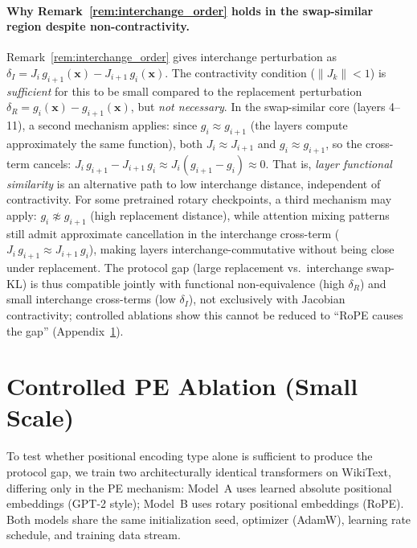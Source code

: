 \documentclass{article}
\begin{document}
\paragraph{Why Remark~\ref{rem:interchange_order} holds in the swap-similar region despite non-contractivity.}
Remark~\ref{rem:interchange_order} gives interchange perturbation as $\delta_I = J_i\, g_{i+1}(\mathbf{x}) - J_{i+1}\, g_i(\mathbf{x})$. The contractivity condition ($\|J_k\| < 1$) is \emph{sufficient} for this to be small compared to the replacement perturbation $\delta_R = g_i(\mathbf{x}) - g_{i+1}(\mathbf{x})$, but \emph{not necessary}. In the swap-similar core (layers 4--11), a second mechanism applies: since $g_i \approx g_{i+1}$ (the layers compute approximately the same function), both $J_i \approx J_{i+1}$ and $g_i \approx g_{i+1}$, so the cross-term cancels: $J_i\, g_{i+1} - J_{i+1}\, g_i \approx J_i(g_{i+1} - g_i) \approx 0$. That is, \emph{layer functional similarity} is an alternative path to low interchange distance, independent of contractivity. For some pretrained rotary checkpoints, a third mechanism may apply: $g_i \not\approx g_{i+1}$ (high replacement distance), while attention mixing patterns still admit approximate cancellation in the interchange cross-term ($J_i\, g_{i+1} \approx J_{i+1}\, g_i$), making layers interchange-commutative without being close under replacement. The protocol gap (large replacement vs.\ interchange swap-KL) is thus compatible jointly with functional non-equivalence (high $\delta_R$) and small interchange cross-terms (low $\delta_I$), not exclusively with Jacobian contractivity; controlled ablations show this cannot be reduced to ``RoPE causes the gap'' (Appendix~\ref{sec:app_pe_ablation}).

\section{Controlled PE Ablation (Small Scale)}
\label{sec:app_pe_ablation}

To test whether positional encoding type alone is sufficient to produce the protocol gap, we train two architecturally identical transformers on WikiText, differing only in the PE mechanism: Model~A uses learned absolute positional embeddings (GPT-2 style); Model~B uses rotary positional embeddings (RoPE). Both models share the same initialization seed, optimizer (AdamW), learning rate schedule, and training data stream.
\end{document}
